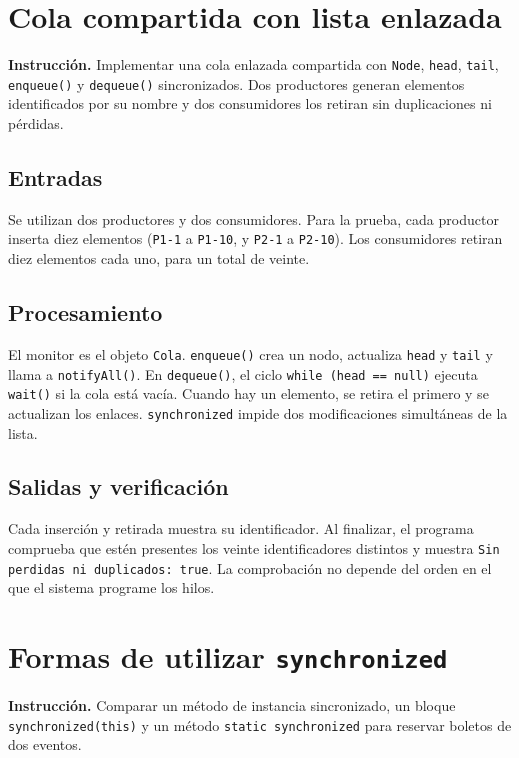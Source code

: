 \documentclass[12pt,oneside]{book}
\begin{document}
\frontmatter
\tableofcontents
\listoffigures
\listoftables
\mainmatter

\chapter{Cola compartida con lista enlazada}
\textbf{Instrucción.} Implementar una cola enlazada compartida con \texttt{Node}, \texttt{head}, \texttt{tail}, \texttt{enqueue()} y \texttt{dequeue()} sincronizados. Dos productores generan elementos identificados por su nombre y dos consumidores los retiran sin duplicaciones ni pérdidas.

\section{Entradas}
Se utilizan dos productores y dos consumidores. Para la prueba, cada productor inserta diez elementos (\texttt{P1-1} a \texttt{P1-10}, y \texttt{P2-1} a \texttt{P2-10}). Los consumidores retiran diez elementos cada uno, para un total de veinte.

\section{Procesamiento}
El monitor es el objeto \texttt{Cola}. \texttt{enqueue()} crea un nodo, actualiza \texttt{head} y \texttt{tail} y llama a \texttt{notifyAll()}. En \texttt{dequeue()}, el ciclo \texttt{while (head == null)} ejecuta \texttt{wait()} si la cola está vacía. Cuando hay un elemento, se retira el primero y se actualizan los enlaces. \texttt{synchronized} impide dos modificaciones simultáneas de la lista.

\section{Salidas y verificación}
Cada inserción y retirada muestra su identificador. Al finalizar, el programa comprueba que estén presentes los veinte identificadores distintos y muestra \texttt{Sin perdidas ni duplicados: true}. La comprobación no depende del orden en el que el sistema programe los hilos.


\chapter{Formas de utilizar \texttt{synchronized}}
\textbf{Instrucción.} Comparar un método de instancia sincronizado, un bloque \texttt{synchronized(this)} y un método \texttt{static synchronized} para reservar boletos de dos eventos.
\end{document}
